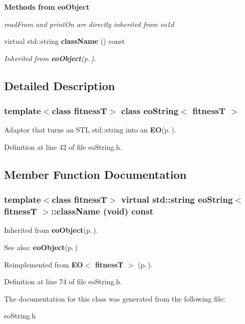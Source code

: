 \begin{Indent}{\bf Methods from eo\-Object}\par
{\em read\-From and print\-On are directly inherited from eo1d }\begin{CompactItemize}
\item 
virtual std::string {\bf class\-Name} () const 
\begin{CompactList}\small\item\em Inherited from {\bf eo\-Object}{\rm (p.\,\pageref{classeo_object})}. \item\end{CompactList}\end{CompactItemize}
\end{Indent}


\subsection{Detailed Description}
\subsubsection*{template$<$class fitness\-T$>$ class eo\-String$<$ fitness\-T $>$}

Adaptor that turns an STL std::string into an {\bf EO}{\rm (p.\,\pageref{class_e_o})}. 



Definition at line 42 of file eo\-String.h.

\subsection{Member Function Documentation}
\subsubsection{\setlength{\rightskip}{0pt plus 5cm}template$<$class fitness\-T$>$ virtual std::string {\bf eo\-String}$<$ fitness\-T $>$::class\-Name (void) const\hspace{0.3cm}{\tt  [inline, virtual]}}\label{classeo_string_z26_0}


Inherited from {\bf eo\-Object}{\rm (p.\,\pageref{classeo_object})}. 

\begin{Desc}
\item[See also:]{\bf eo\-Object}{\rm (p.\,\pageref{classeo_object})} \end{Desc}


Reimplemented from {\bf EO$<$ fitness\-T $>$} {\rm (p.\,\pageref{class_e_o_z10_0})}.

Definition at line 74 of file eo\-String.h.

The documentation for this class was generated from the following file:\begin{CompactItemize}
\item 
eo\-String.h\end{CompactItemize}
